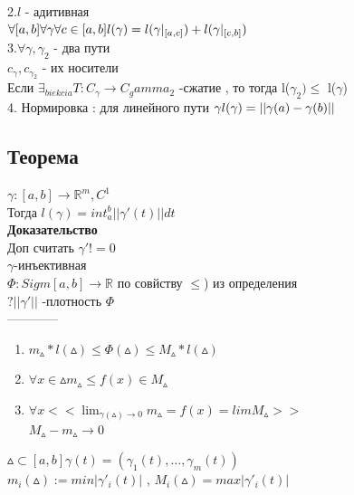 \documentclass[12pt, a4paper]{article}
\begin{document}
	2.$l$ - адитивная\\
	$\forall [a,b] \forall \gamma \forall c \in [a,b]\\
	l(\gamma) = l(\gamma|_{[a,c]})+l(\gamma|_{[c,b]})$\\
	
	3.$\forall \gamma,\gamma_2$ - два пути\\
	$c_\gamma, c_{\gamma_2}$ - их носители\\
	Если $\exists _{biekcia} T:  C_\gamma \rightarrow C_gamma_2$ -сжатие , то тогда l($\gamma_2)\leq$ l($\gamma$)\\
	
	4.  Нормировка : для линейного пути $\gamma   \\ l(\gamma)=||\gamma(a)-\gamma(b)||$  \\
	\subsection{Теорема}
	$\gamma : [a,b] \rightarrow \mathbb{R}^m, C^1$\\
	Тогда $l(\gamma)=int_{a}^{b}||\gamma'(t)|| dt $\\
	\textbf{Доказательство}\\
	Доп считать $\gamma' != 0 $\\
	$\gamma$-инъективная\\
	$\Phi: Sigm[a,b] \rightarrow \mathbb{R}$ по совйству $\leq$) из    определения\\
	$?||\gamma'||$ -плотность $\Phi$\\
	------------\\
	\begin{enumerate}
		\item   
		$m_{\vartriangle}*l(\vartriangle) \leq \Phi(\vartriangle)\leq     M_\vartriangle*l(\vartriangle)$ \\
		\item
		$\forall x \in \vartriangle  m_\vartriangle \leq f(x) \in M_\vartriangle$ \\
		\item
		$\forall x  << \lim_{\gamma(\vartriangle)\rightarrow 0}  m_\vartriangle =f(x) = lim M_\vartriangle >>$ \\
		$M_\vartriangle -m_\vartriangle \rightarrow 0$ \\
	\end{enumerate}
	$\vartriangle \subset [a,b] \gamma(t)=(\gamma_1(t),\dots,\gamma_m(t))$\\
	$m_i(\vartriangle):= min|\gamma'_i(t)|$ ,   $M_i(\vartriangle)=max|\gamma'_i(t)|$\\
\end{document}
